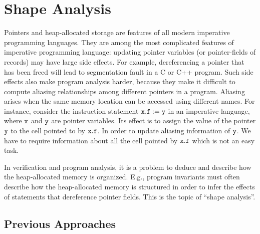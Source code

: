 
\chapter{Shape Analysis}
Pointers and heap-allocated storage are features of all modern imperative programming languages.
They are among the most
complicated features of imperative programming language:
updating pointer variables (or pointer-fields of records) may have large side effects.
For example, dereferencing a pointer that has been freed will lead to segmentation fault in a C or C++ program.
Such side effects also make program analysis harder, because they make it
difficult to compute aliasing relationships among different pointers in a program. Aliasing arises when the same memory location can be accessed using different names.
For instance, consider the instruction statement $\tt x.f := y$ in an imperative language, where $\tt x$ and $\tt y$ are pointer variables. Its effect is to assign the value of the pointer $\tt y$ to the cell pointed to by $\tt x.f$. In order to update aliasing information of $\tt y$. We have to require information about all the cell pointed by $\tt x.f$ which is not an easy task.

In verification and program analysis, it is a problem to deduce and describe  how the heap-allocated memory is organized. E.g., program invariants must often describe how the heap-allocated memory is structured in order to infer the effects of statements that dereference pointer fields. This is the topic of ``shape analysis''.


\section{Previous Approaches} 

